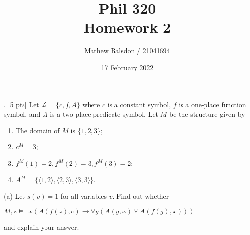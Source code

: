 \documentclass[11pt]{article}
\title{Phil 320\\Homework 2}
\author{Mathew Balsdon / 21041694}
\date{17 February 2022}%
\begin{document}
\maketitle

. [5 pts] Let $\mathcal{L} = \{c, f, A\}$ where $c$ is a constant symbol, $f$ is a one-place function symbol, and $A$ is a two-place predicate symbol. Let $M$ be the structure given by

\begin{enumerate}
\item The domain of $M$ is $\{1,2,3\}$;
\item $c^M = 3$;
\item $f^M(1) = 2, f^M(2) = 3, f^M(3) = 2$;
\item $A^M = \{\langle1, 2\rangle, \langle2, 3\rangle, \langle3, 3\rangle\}$.
\end{enumerate}

\noindent
(a) Let $s(v) = 1$ for all variables $v$. Find out whether
\begin{center}
$M,s \models \exists x(A(f(z), c) \rightarrow \forall y(A(y,x) \vee A(f(y),x)))$
\end{center}
and explain your answer. \\
\end{document}
